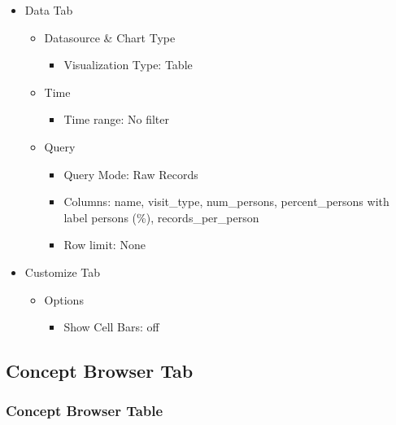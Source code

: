 \documentclass[
]{book}
\providecommand{\tightlist}{%
  \setlength{\itemsep}{0pt}\setlength{\parskip}{0pt}}
\begin{document}
\begin{itemize}
\tightlist
\item
  Data Tab

  \begin{itemize}
  \tightlist
  \item
    Datasource \& Chart Type

    \begin{itemize}
    \tightlist
    \item
      Visualization Type: Table
    \end{itemize}
  \item
    Time

    \begin{itemize}
    \tightlist
    \item
      Time range: No filter
    \end{itemize}
  \item
    Query

    \begin{itemize}
    \tightlist
    \item
      Query Mode: Raw Records
    \item
      Columns: name, visit\_type, num\_persons, percent\_persons with label persons (\%), records\_per\_person
    \item
      Row limit: None
    \end{itemize}
  \end{itemize}
\item
  Customize Tab

  \begin{itemize}
  \tightlist
  \item
    Options

    \begin{itemize}
    \tightlist
    \item
      Show Cell Bars: off
    \end{itemize}
  \end{itemize}
\end{itemize}

\hypertarget{concept-browser-tab}{%
\subsection*{Concept Browser Tab}\label{concept-browser-tab}}

\hypertarget{concept-browser-table}{%
\subsubsection*{Concept Browser Table}\label{concept-browser-table}}
\end{document}
